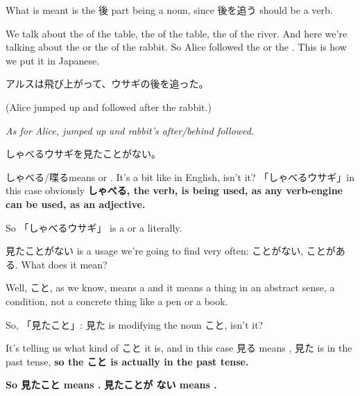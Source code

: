 {}

What is meant is the 後 part being a noun, since 後を追う should be a verb.

We talk about the  of the table, the  of the table, the  of the river. And here we're talking about the  or the  of the rabbit. So Alice followed the  or the . This is how we put it in Japanese.

\startblockquote
アルスは飛び上がって、ウサギの後を追った。
\stopblockquote

(Alice jumped up and followed after the rabbit.)

{\em As for Alice, jumped up and rabbit's after/behind followed.}

\thinrule

しゃべるウサギを見たことがない。

{}

しゃべる/喋るmeans  or . It's a bit like  in English, isn't it? 「しゃべるウサギ」in this case obviously {\bf しゃべる, the verb, is being used, as any verb-engine can be used, as an adjective.}

{}

So 「しゃべるウサギ」 is a  or a  literally.

見たことがない is a usage we're going to find very often: ことがない, ことがある. What does it mean?

\startsectionlevel[title={ことがある},reference={ことがある}]

Well, こと, as we know, means a  and it means a thing in an abstract sense, a condition, not a concrete thing like a pen or a book.

{}

So, 「見たこと」: 見た is modifying the noun こと, isn't it?

{}

It's telling us what kind of こと it is, and in this case 見る means , 見た is  in the past tense, {\bf so the こと is actually  in the past tense.}

{}

{\bf So 見たこと means .} {\bf 見たことが ない means .}

